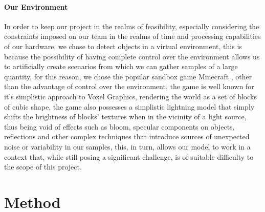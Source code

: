 \documentclass[10pt,journal,cspaper,compsoc]{IEEEtran}
\begin{document}
    
    \paragraph*{Our Environment}
    In order to keep our project in the realms of feasibility, especially considering the constraints imposed on our team in the 
    realms of time and processing capabilities of our hardware, we chose to detect objects in a virtual environment, this is because 
    the possibility of having complete control over the environment allows us to artificially create scenarios from which we can gather 
    samples of a large quantity, for this reason, we chose the popular sandbox game Minecraft \cite{Mojang-Minecraft}, other than 
    the advantage of control over the environment, the game is well known for it's simplistic approach to Voxel Graphics, rendering 
    the world as a set of blocks of cubic shape, the game also possesses a simplistic lightning model that simply shifts the brightness
    of blocks' textures when in the vicinity of a light source, thus being void of effects such as bloom, specular components on objects,
    reflections and other complex techniques that introduce sources of unexpected noise or variability in our samples, this, in turn, 
    allows our model to work in a context that, while still posing a significant challenge, is of suitable difficulty to the scope of 
    this project.



 \section{Method}   
\end{document}
